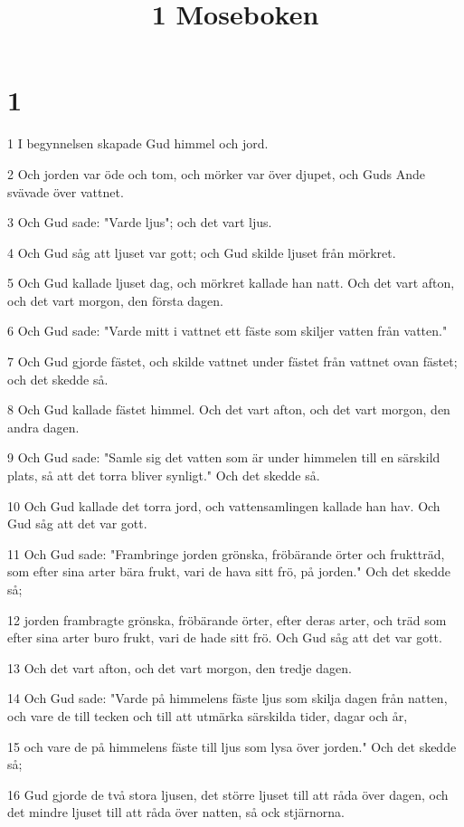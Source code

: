 

\title{1 Moseboken}


\chapter{1}

\par 1 I begynnelsen skapade Gud himmel och jord.
\par 2 Och jorden var öde och tom, och mörker var över djupet, och Guds Ande svävade över vattnet.
\par 3 Och Gud sade: "Varde ljus"; och det vart ljus.
\par 4 Och Gud såg att ljuset var gott; och Gud skilde ljuset från mörkret.
\par 5 Och Gud kallade ljuset dag, och mörkret kallade han natt. Och det vart afton, och det vart morgon, den första dagen.
\par 6 Och Gud sade: "Varde mitt i vattnet ett fäste som skiljer vatten från vatten."
\par 7 Och Gud gjorde fästet, och skilde vattnet under fästet från vattnet ovan fästet; och det skedde så.
\par 8 Och Gud kallade fästet himmel. Och det vart afton, och det vart morgon, den andra dagen.
\par 9 Och Gud sade: "Samle sig det vatten som är under himmelen till en särskild plats, så att det torra bliver synligt." Och det skedde så.
\par 10 Och Gud kallade det torra jord, och vattensamlingen kallade han hav. Och Gud såg att det var gott.
\par 11 Och Gud sade: "Frambringe jorden grönska, fröbärande örter och fruktträd, som efter sina arter bära frukt, vari de hava sitt frö, på jorden." Och det skedde så;
\par 12 jorden frambragte grönska, fröbärande örter, efter deras arter, och träd som efter sina arter buro frukt, vari de hade sitt frö. Och Gud såg att det var gott.
\par 13 Och det vart afton, och det vart morgon, den tredje dagen.
\par 14 Och Gud sade: "Varde på himmelens fäste ljus som skilja dagen från natten, och vare de till tecken och till att utmärka särskilda tider, dagar och år,
\par 15 och vare de på himmelens fäste till ljus som lysa över jorden." Och det skedde så;
\par 16 Gud gjorde de två stora ljusen, det större ljuset till att råda över dagen, och det mindre ljuset till att råda över natten, så ock stjärnorna.
